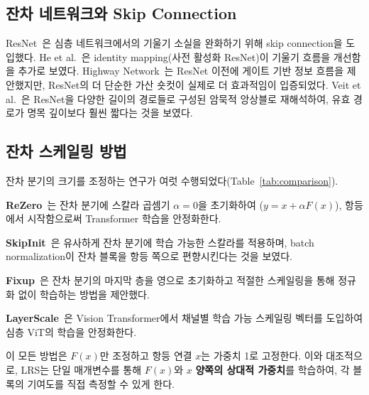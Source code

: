 \documentclass[preprint,12pt]{elsarticle}
\begin{document}
\subsection{잔차 네트워크와 Skip Connection}

ResNet~\cite{he2016deep}은 심층 네트워크에서의 기울기 소실을 완화하기 위해 skip connection을 도입했다. He et al.~\cite{he2016identity}은 identity mapping(사전 활성화 ResNet)이 기울기 흐름을 개선함을 추가로 보였다. Highway Network~\cite{srivastava2015highway}는 ResNet 이전에 게이트 기반 정보 흐름을 제안했지만, ResNet의 더 단순한 가산 숏컷이 실제로 더 효과적임이 입증되었다. Veit et al.~\cite{veit2016residual}은 ResNet을 다양한 길이의 경로들로 구성된 암묵적 앙상블로 재해석하여, 유효 경로가 명목 깊이보다 훨씬 짧다는 것을 보였다.

\subsection{잔차 스케일링 방법}

잔차 분기의 크기를 조정하는 연구가 여럿 수행되었다(Table~\ref{tab:comparison}).

\textbf{ReZero}~\cite{bachlechner2021rezero}는 잔차 분기에 스칼라 곱셈기 $\alpha = 0$을 초기화하여 ($y = x + \alpha F(x)$), 항등에서 시작함으로써 Transformer 학습을 안정화한다.

\textbf{SkipInit}~\cite{de2020batch}은 유사하게 잔차 분기에 학습 가능한 스칼라를 적용하며, batch normalization이 잔차 블록을 항등 쪽으로 편향시킨다는 것을 보였다.

\textbf{Fixup}~\cite{zhang2019fixup}은 잔차 분기의 마지막 층을 영으로 초기화하고 적절한 스케일링을 통해 정규화 없이 학습하는 방법을 제안했다.

\textbf{LayerScale}~\cite{touvron2021going}은 Vision Transformer에서 채널별 학습 가능 스케일링 벡터를 도입하여 심층 ViT의 학습을 안정화한다.

이 모든 방법은 $F(x)$만 조정하고 항등 연결 $x$는 가중치 1로 고정한다. 이와 대조적으로, LRS는 단일 매개변수를 통해 $F(x)$와 $x$ \textbf{양쪽의 상대적 가중치}를 학습하여, 각 블록의 기여도를 직접 측정할 수 있게 한다.
\end{document}
